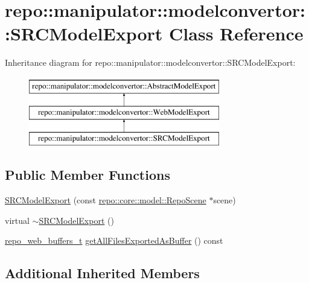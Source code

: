 \hypertarget{classrepo_1_1manipulator_1_1modelconvertor_1_1_s_r_c_model_export}{}\section{repo\+:\+:manipulator\+:\+:modelconvertor\+:\+:S\+R\+C\+Model\+Export Class Reference}
\label{classrepo_1_1manipulator_1_1modelconvertor_1_1_s_r_c_model_export}
Inheritance diagram for repo\+:\+:manipulator\+:\+:modelconvertor\+:\+:S\+R\+C\+Model\+Export\+:\begin{figure}[H]
\begin{center}
\leavevmode
\includegraphics[height=3.000000cm]{classrepo_1_1manipulator_1_1modelconvertor_1_1_s_r_c_model_export}
\end{center}
\end{figure}
\subsection*{Public Member Functions}
\begin{DoxyCompactItemize}
\item 
\hyperlink{classrepo_1_1manipulator_1_1modelconvertor_1_1_s_r_c_model_export_a2207050092968dbbcd7fc403522acca2}{S\+R\+C\+Model\+Export} (const \hyperlink{classrepo_1_1core_1_1model_1_1_repo_scene}{repo\+::core\+::model\+::\+Repo\+Scene} $\ast$scene)
\item 
virtual \hyperlink{classrepo_1_1manipulator_1_1modelconvertor_1_1_s_r_c_model_export_a8f7e17fe1b536103171f884d84a2ea96}{$\sim$\+S\+R\+C\+Model\+Export} ()
\item 
\hyperlink{structrepo__web__buffers__t}{repo\+\_\+web\+\_\+buffers\+\_\+t} \hyperlink{classrepo_1_1manipulator_1_1modelconvertor_1_1_s_r_c_model_export_aabc41be1f3f75ab3cba44df16e40850e}{get\+All\+Files\+Exported\+As\+Buffer} () const 
\end{DoxyCompactItemize}
\subsection*{Additional Inherited Members}


